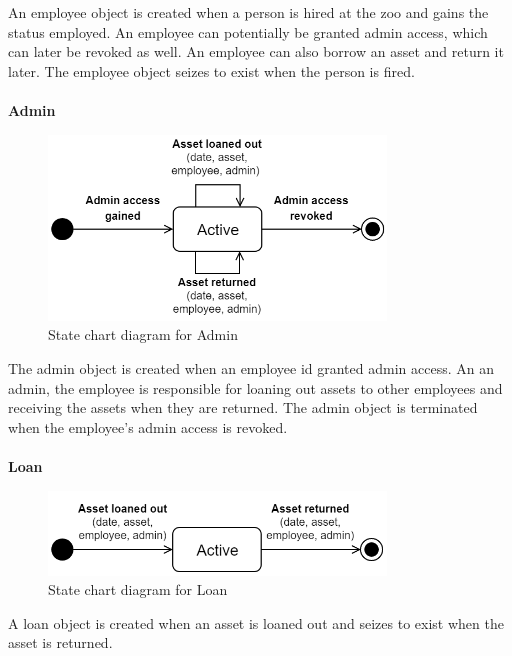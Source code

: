 An employee object is created when a person is hired at the zoo and gains the status employed. An employee can potentially be granted admin access, which can later be revoked as well. An employee can also borrow an asset and return it later. The employee object seizes to exist when the person is fired. 
\\\\

\large{\textbf{Admin}}
\begin{figure}[H]
    \centering
    \includegraphics[width=0.8\textwidth]{figures/StateChart_Admin.png}
    \caption{State chart diagram for Admin}
    \label{fig:admin_statechart}
\end{figure}

The admin object is created when an employee id granted admin access. An an admin, the employee is responsible for loaning out assets to other employees and receiving the assets when they are returned. The admin object is terminated when the employee's admin access is revoked. 
\\\\

\large{\textbf{Loan}}
\begin{figure}[H]
    \centering
    \includegraphics[width=0.8\textwidth]{figures/StateChart_Loan.png}
    \caption{State chart diagram for Loan}
    \label{fig:loan_statechart}
\end{figure}

A loan object is created when an asset is loaned out and seizes to exist when the asset is returned.